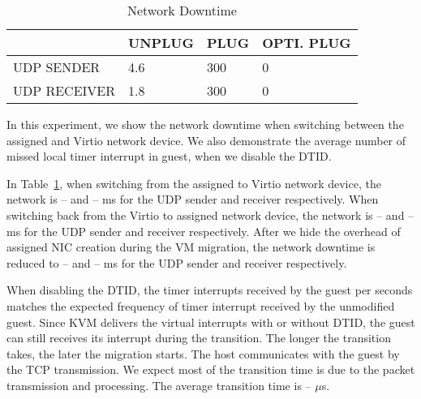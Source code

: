 

\begin{table}[]
\begin{tabular}{|l|l|l|l|}
\hline
& UNPLUG & PLUG & OPTI. PLUG \\ \hline
UDP SENDER & 4.6 & 300 & 0 \\ \hline
UDP RECEIVER & 1.8 & 300 & 0 \\ \hline
\end{tabular}
\caption{Network Downtime}
\label{tab:migration_network_downtime}
\end{table}

In this experiment, we show the network downtime when
switching between the assigned and Virtio network device. We
also demonstrate the average number of missed local timer
interrupt in guest, when we disable the DTID.

In Table~\ref{tab:migration_network_downtime}, when switching
from the assigned to Virtio network device, the network is --
and -- ms for the UDP sender and receiver respectively. When
switching back from the Virtio to assigned network device, the
network is -- and -- ms for the UDP sender and receiver
respectively. After we hide the overhead of assigned NIC
creation during the VM migration, the network downtime is
reduced to -- and -- ms for the UDP sender and receiver
respectively.

When disabling the DTID, the timer interrupts received by the
guest per seconds matches the expected frequency of timer
interrupt received by the unmodified guest. Since KVM delivers
the virtual interrupts with or without DTID, the guest can
still receives its interrupt during the transition. The longer
the transition takes, the later the migration starts. The host
communicates with the guest by the TCP transmission. We expect
most of the transition time is due to the packet transmission
and processing. The average transition time is -- $\mu$s.

